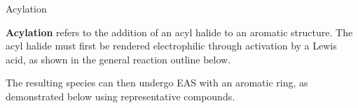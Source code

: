       \begin{core}[label=core:acylation]{Acylation}

        \textbf{Acylation} refers to the addition of an acyl halide to an aromatic structure. The acyl halide must first be rendered electrophilic through activation by a Lewis acid, as shown in the general reaction outline below.


        The resulting  species can then undergo EAS with an aromatic ring, as demonstrated below using representative compounds.


\end{core}
